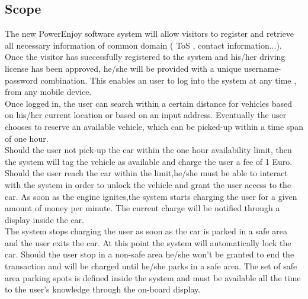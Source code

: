 \documentclass[12pt]{article}
\begin{document}
	 \subsection{\label{scope:1}Scope}
	The new PowerEnjoy software system will allow visitors to register and retrieve all necessary information of common domain ( ToS , contact information...). \\Once the visitor has successfully registered to the system and his/her driving license has been approved, he/she will be provided with a unique username-password combination. This enables an user to log into the system at any time , from any mobile device. \\Once logged in, the user can search within a certain distance for vehicles based on his/her current location or based on an input address. 
	Eventually the user chooses to reserve an available vehicle, which can be picked-up within a time span of one hour.\\ 
	Should the user not pick-up the car within the one hour availability limit, then the system will tag the vehicle as available and charge the user a fee of 1 Euro.\\
	Should the user reach the car within the limit,he/she must be able to  interact with the system in order to unlock the vehicle and grant the user access to the car.
	As soon as the engine ignites,the system starts charging the user for a given amount of money per minute. The current charge will be notified through a display inside the car.\\
	The system stops charging the user as soon as the car is parked in a safe area and the user exits the car. At this point the system will automatically lock the car.
	Should the user stop in a non-safe area he/she won't be granted to end the transaction and will be charged until  he/she parks in a safe area.
	The set of safe area parking spots is defined inside the system and must be available all the time to the user's knowledge through the on-board display.
	
\end{document}
